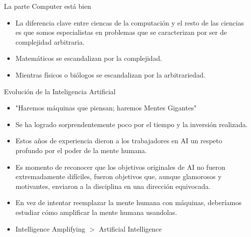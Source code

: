 \documentclass{beamer}
\begin{document}
\begin{frame}{La parte Computer está bien}
\begin{itemize}
\item[] La diferencia clave entre ciencas de la computación
y el resto de las ciencias es que somos especialistas en problemas 
que se caracterizan por ser de complejidad arbitraria.
\item[] Matemáticos se escandalizan por la complejidad. 
\item[] Mientras físicos o biólogos se escandalizan por 
la arbitrariedad.
\end{itemize}
\end{frame}

\begin{frame}{Evolución de la Inteligencia Artificial}
\begin{itemize}
\item "Haremos máquinas que piensan; haremos Mentes Gigantes"
\item Se ha logrado sorprendentemente poco por el tiempo y la inversión realizada.
\item Estos años de experiencia dieron a los trabajadores en AI 
un respeto profundo por el poder de la mente humana.
\item Es momento de reconocer que los objetivos originales de AI 
no fueron extremadamente difíciles,
fueron objetivos que, aunque glamorosos y motivantes, 
enviaron a la disciplina en una dirección equivocada.
\item En vez de intentar reemplazar la mente humana con máquinas, 
deberíamos estudiar cómo amplificar la mente humana usandolas.
\item Intelligence Amplifying $>$ Artificial Intelligence
\end{itemize}
\end{frame}
\end{document}
